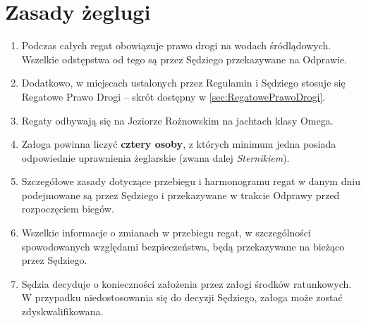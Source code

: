 \documentclass[12pt,a4paper]{article}
\begin{document}
\section{Zasady żeglugi}
\begin{enumerate}
    \item Podczas całych regat obowiązuje prawo drogi na wodach śródlądowych. Wszelkie odstępstwa od tego są przez Sędziego przekazywane na Odprawie.
    \item Dodatkowo, w miejscach ustalonych przez Regulamin i Sędziego stosuje się Regatowe Prawo Drogi -- skrót dostępny w \ref{sec:RegatowePrawoDrogi}.
    \item Regaty odbywają się na Jeziorze Rożnowskim na jachtach klasy Omega.
    \item Załoga powinna liczyć \textbf{cztery osoby}, z których minimum jedna posiada odpowiednie uprawnienia żeglarskie (zwana dalej \textit{Sternikiem}).
    \item Szczegółowe zasady dotyczące przebiegu i harmonogramu regat w danym dniu podejmowane są przez Sędziego i przekazywane w trakcie Odprawy przed rozpoczęciem biegów.
    \item Wszelkie informacje o zmianach w przebiegu regat, w szczególności spowodowanych względami bezpieczeństwa, będą przekazywane na bieżąco przez Sędziego.
    \item Sędzia decyduje o konieczności założenia przez załogi środków ratunkowych. W przypadku niedostosowania się do decyzji Sędziego, załoga może zostać zdyskwalifikowana. 
\end{enumerate}
\end{document}
